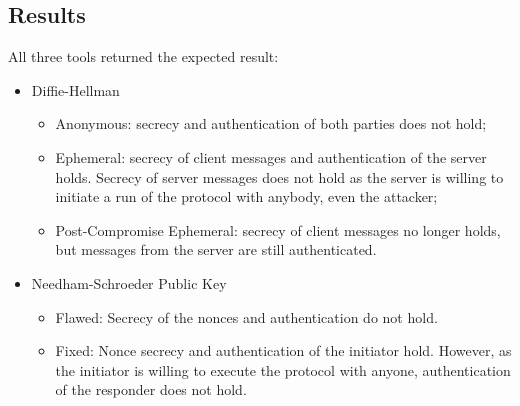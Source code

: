 \subsection{Results}

All three tools returned the expected result:
\begin{itemize}
    \item{Diffie-Hellman
                \begin{itemize}
                    \item Anonymous: secrecy and authentication of both parties does not hold;
                    \item Ephemeral: secrecy of client messages and authentication of the server holds. Secrecy of server messages does not hold as the server is willing to initiate a run of the protocol with anybody, even the attacker;
                    \item Post-Compromise Ephemeral: secrecy of client messages no longer holds, but messages from the server are still authenticated.
                \end{itemize}
          }
    \item{Needham-Schroeder Public Key
                \begin{itemize}
                    \item Flawed: Secrecy of the nonces and authentication do not hold.
                    \item Fixed: Nonce secrecy and authentication of the initiator hold. However, as the initiator is willing to execute the protocol with anyone, authentication of the responder does not hold.
                \end{itemize}
          }
\end{itemize}